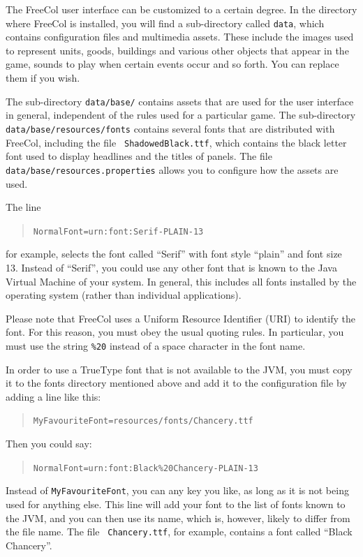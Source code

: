 \documentclass[12pt]{book}
\begin{document}
The FreeCol user interface can be customized to a certain degree. In
the directory where FreeCol is installed, you will find a
sub-directory called {\tt data}, which contains configuration files
and multimedia assets. These include the images used to represent
units, goods, buildings and various other objects that appear in the
game, sounds to play when certain events occur and so forth. You can
replace them if you wish.

The sub-directory {\tt data/base/} contains assets that are used for
the user interface in general, independent of the rules used for a
particular game. The sub-directory {\tt
  data/\-base/\-resources/\-fonts} contains several fonts
that are distributed with FreeCol, including the file {\tt
  ShadowedBlack.ttf}, which contains the black letter font used to
display headlines and the titles of panels. The file {\tt
  data/\-base/\-resources.properties} allows you to configure how the
assets are used.

The line

\begin{quote}
{\tt NormalFont=urn:font:Serif-PLAIN-13}
\end{quote}

for example, selects the font called ``Serif'' with font style
``plain'' and font size 13. Instead of ``Serif'', you could use any
other font that is known to the Java Virtual Machine of your
system. In general, this includes all fonts installed by the operating
system (rather than individual applications).

Please note that FreeCol uses a Uniform Resource Identifier (URI) to
identify the font. For this reason, you must obey the usual quoting
rules. In particular, you must use the string {\tt \%20} instead of a
space character in the font name.

In order to use a TrueType font that is not available to the JVM, you
must copy it to the fonts directory mentioned above and add it to the
configuration file by adding a line like this:

\begin{quote}
{\tt MyFavouriteFont=resources/fonts/Chancery.ttf}
\end{quote}

Then you could say:

\begin{quote}
{\tt NormalFont=urn:font:Black\%20Chancery-PLAIN-13}
\end{quote}

Instead of {\tt MyFavouriteFont}, you can any key you like, as long as
it is not being used for anything else. This line will add your font
to the list of fonts known to the JVM, and you can then use its name,
which is, however, likely to differ from the file name. The file {\tt
  Chancery.ttf}, for example, contains a font called ``Black Chancery''.
\end{document}
